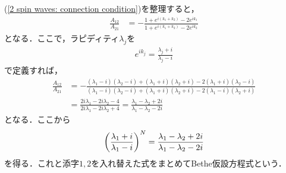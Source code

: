\documentclass[dvipdfmx,9pt]{beamer}
\numberwithin{equation}{section}
\begin{document}
\begin{frame}{}
    (\ref{2 spin waves: connection condition})を整理すると，
    \begin{align}
        \frac{A_{12}}{A_{21}} &
        = -\frac{1+e^{i(k_1+k_2)}-2e^{ik_1}}{1+e^{i(k_1+k_2)}-2e^{ik_2}}
    \end{align}
    となる．ここで，ラピディティ$\lambda_j$を
    \begin{align}
        e^{ik_j} = \frac{\lambda_j + i}{\lambda_j - i}
    \end{align}
    で定義すれば，
    \begin{align}
        \frac{A_{12}}{A_{21}} &\nonumber
        = -\frac{(\lambda_1-i)(\lambda_2-i) + (\lambda_1+i)(\lambda_2+i) - 2(\lambda_1+i)(\lambda_2-i)}
        {(\lambda_1-i)(\lambda_2-i) + (\lambda_1+i)(\lambda_2+i) - 2(\lambda_1-i)(\lambda_2+i)}
        \\ &
        = \frac{2i\lambda_1 - 2i\lambda_2 - 4}
        {2i\lambda_1 - 2i\lambda_2 + 4}
        = \frac{\lambda_1-\lambda_2+2i}
        {\lambda_1-\lambda_2-2i}
    \end{align}
    となる．ここから
    \begin{align}
        \qty(\frac{\lambda_1+i}{\lambda_1-i})^N = \frac{\lambda_1-\lambda_2+2i}
        {\lambda_1-\lambda_2-2i}
    \end{align}
    を得る．これと添字$1,2$を入れ替えた式をまとめてBethe仮設方程式という．
\end{frame}

\end{document}
